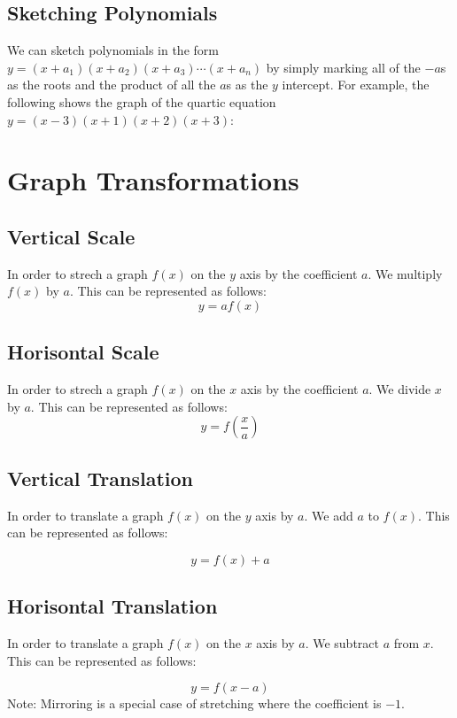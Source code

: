 \documentclass{article}
\begin{document}
\subsection{Sketching Polynomials}
We can sketch polynomials in the form $y=(x + a_1)(x + a_2)(x+a_3)\cdots(x+a_n)$ by simply marking all of the $-a$s
as the roots and the product of all the $a$s as the $y$ intercept. For example, the following shows the graph
of the quartic equation $y=(x-3)(x+1)(x+2)(x+3)$:
\begin{center}
\end{center}

\section{Graph Transformations}
\subsection{Vertical Scale}
In order to strech a graph $f(x)$ on the $y$ axis by the coefficient $a$. We multiply $f(x)$ by $a$.
This can be represented as follows:
\begin{equation}
	y = af(x)
\end{equation}

\subsection{Horisontal Scale}
In order to strech a graph $f(x)$ on the $x$ axis by the coefficient $a$. We divide $x$ by $a$.
This can be represented as follows:
\begin{equation}
	y = f\left(\frac{x}{a}\right)
\end{equation}
\subsection{Vertical Translation}
In order to translate a graph $f(x)$ on the $y$ axis by $a$. We add $a$ to $f(x)$. This can be
represented as follows:

\begin{equation}
	y = f(x) + a
\end{equation}
\subsection{Horisontal Translation}
In order to translate a graph $f(x)$ on the $x$ axis by $a$. We subtract $a$ from $x$. This can be
represented as follows:

\begin{equation}
	y = f(x - a)
\end{equation}
Note: Mirroring is a special case of stretching where the coefficient is $-1$.
\end{document}
